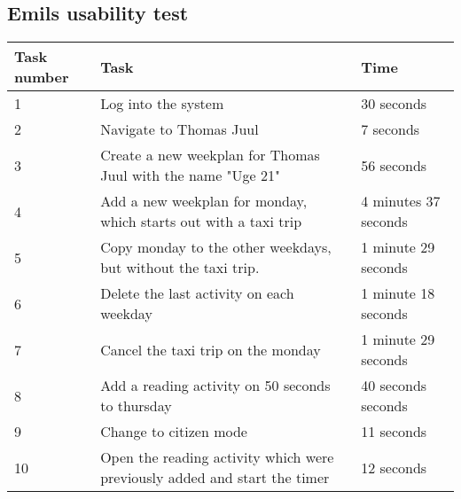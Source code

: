 \subsection{Emils usability test}\label{usability-test-14-05-emil}
\begin{table}[H]
    \small
    \begin{tabular}{|p{1.3cm}|p{10cm}|p{1.7cm}|}
    \hline
    Task number      &Task                                                                                                               & Time      \\ \hline
    1 & Log into the system                                                                                                             & 30 seconds  \\ \hline
    2 & Navigate to Thomas Juul                                                                                                         & 7 seconds  \\ \hline
    3 & Create a new weekplan for Thomas Juul with the name "Uge 21"                                                                    &  56 seconds \\ \hline
    4 & Add a new weekplan for monday, which starts out with a taxi trip                                                               & 4 minutes 37 seconds   \\ \hline
    5 & Copy monday to the other weekdays, but without the taxi trip.                                                                 & 1 minute 29 seconds   \\ \hline
    6 & Delete the last activity on each weekday                                                                                    & 1 minute 18 seconds   \\ \hline
    7 & Cancel the taxi trip on the monday                                                                                           & 1 minute 29 seconds  \\ \hline
    8 & Add a reading activity on 50 seconds to thursday                                                                           & 40 seconds seconds   \\ \hline
    9 & Change to citizen mode                                                                                                    & 11 seconds   \\ \hline
    10 & Open the reading activity which were previously added and start the timer                                                  & 12 seconds   \\ \hline

\end{tabular}
\end{table}
